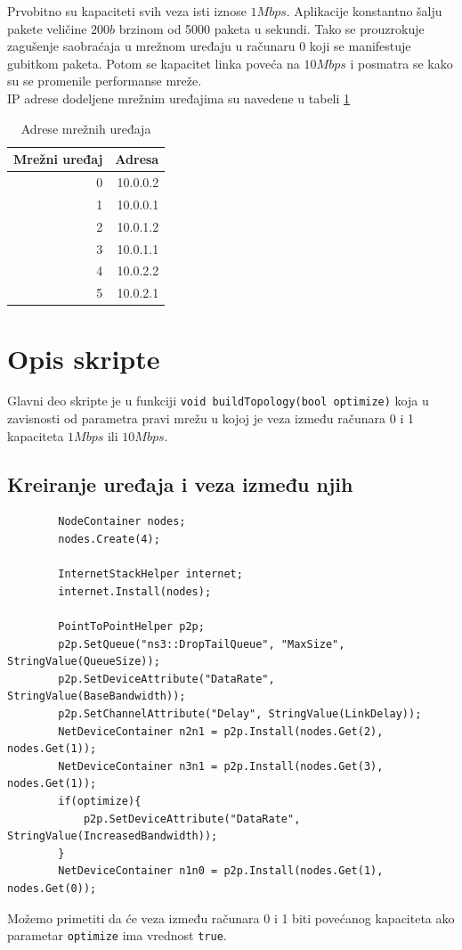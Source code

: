 \documentclass[a4paper, 12pt, projekat]{etf}
\begin{document}
	Prvobitno su kapaciteti svih veza isti iznose $1Mbps$.  Aplikacije konstantno šalju pakete veličine $200b$ brzinom od 5000 paketa u sekundi. Tako se prouzrokuje zagušenje saobraćaja u mrežnom uređaju u računaru 0 koji se manifestuje gubitkom paketa. Potom se kapacitet linka poveća na $10Mbps$ i posmatra se kako su se promenile performanse mreže.\\
	IP adrese dodeljene mrežnim uređajima su navedene u tabeli \ref{tab:adr}
	\begin{table}[htb]
		\centering
		\caption{Adrese mrežnih uređaja}
		\label{tab:adr}
		\medskip
		\begin{tabular}{r|r}
			\hline
			Mrežni uređaj & Adresa \\
			\hline
			0 & 10.0.0.2 \\
			1 & 10.0.0.1 \\
			2 & 10.0.1.2 \\
			3 & 10.0.1.1 \\
			4 & 10.0.2.2 \\
			5 & 10.0.2.1
		\end{tabular}
	\end{table}
	\section{Opis skripte}
	Glavni deo skripte je u funkciji \verb|void buildTopology(bool optimize)| koja u zavisnosti od parametra pravi mrežu u kojoj je veza između računara 0 i 1 kapaciteta $1Mbps$ ili $10Mbps$.
	\subsection{Kreiranje uređaja i veza između njih}
	\begin{verbatim}
		NodeContainer nodes;
		nodes.Create(4);
		
		InternetStackHelper internet;
		internet.Install(nodes);
		
		PointToPointHelper p2p;
		p2p.SetQueue("ns3::DropTailQueue", "MaxSize", StringValue(QueueSize));
		p2p.SetDeviceAttribute("DataRate", StringValue(BaseBandwidth));
		p2p.SetChannelAttribute("Delay", StringValue(LinkDelay));
		NetDeviceContainer n2n1 = p2p.Install(nodes.Get(2), nodes.Get(1));
		NetDeviceContainer n3n1 = p2p.Install(nodes.Get(3), nodes.Get(1));
		if(optimize){
			p2p.SetDeviceAttribute("DataRate", StringValue(IncreasedBandwidth));
		}
		NetDeviceContainer n1n0 = p2p.Install(nodes.Get(1), nodes.Get(0));
	\end{verbatim}
	Možemo primetiti da će veza između računara 0 i 1 biti povećanog kapaciteta ako parametar \verb|optimize| ima vrednost \verb|true|.
\end{document}
